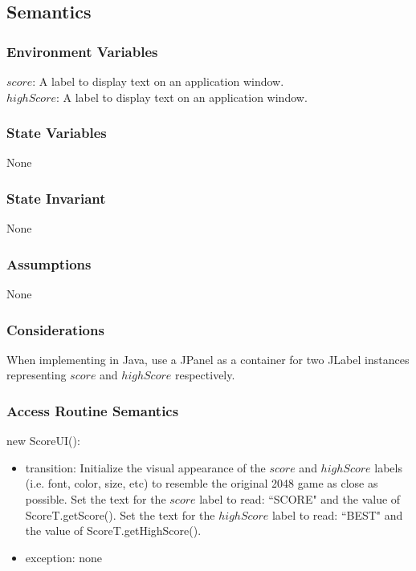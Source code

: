\documentclass[12pt]{article}
\begin{document}
\subsection* {Semantics}

\subsubsection* {Environment Variables}

$score$: A label to display text on an application window. \\
$highScore$: A label to display text on an application window.

\subsubsection* {State Variables}

None

\subsubsection* {State Invariant}

None

\subsubsection* {Assumptions}

None

\subsubsection* {Considerations}

When implementing in Java, use a JPanel as a container for two JLabel instances representing $score$ and $highScore$ respectively.

\newpage

\subsubsection* {Access Routine Semantics}

\noindent new ScoreUI():
\begin{itemize}
\item transition: Initialize the visual appearance of the $score$ and $highScore$ labels (i.e. font, color, size, etc) to resemble the original 2048 game as close as possible. Set the text for the $score$ label to read: ``SCORE" and the value of ScoreT.getScore(). Set the text for the $highScore$ label to read: ``BEST" and the value of  ScoreT.getHighScore().
\item exception: none
\end{itemize}
\end{document}

